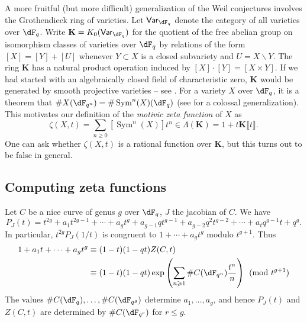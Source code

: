 A more fruitful (but more difficult) generalization of the Weil conjectures 
involves the Grothendieck ring of varieties. Let $\mathsf{Var}_{\dF_q}$ denote 
the category of all varieties over $\dF_q$. Write 
$\mathbf K=K_0(\mathsf{Var}_{\dF_q})$ for the quotient of the free abelian 
group on isomorphism classes of varieties over $\dF_q$ by relations of the 
form $[X]=[Y]+[U]$ whenever $Y\subset X$ is a closed subvariety and 
$U=X\smallsetminus Y$. The ring $\mathbf K$ has a natural product operation 
induced by $[X]\cdot [Y] = [X\times Y]$. If we had started with an 
algebraically closed field of characteristic zero, $\mathbf K$ would be 
generated by smooth projective varieties -- see \cite{bi04}.
For a variety $X$ over $\dF_q$, it is a theorem that 
$\# X(\dF_{q^n}) = \# \operatorname{Sym}^n(X)(\dF_q)$ (see 
\cite[III.2.11]{de77} for a colossal generalization). This motivates our 
definition of the \emph{motivic zeta function} of $X$ as 
\[
  \zeta(X,t) = \sum_{n\geqslant 0} [\operatorname{Sym}^n(X)] t^n \in \Lambda(\mathbf K) = 1+t\mathbf K\llbracket t\rrbracket \text{.}
\]
One can ask whether $\zeta(X,t)$ is a rational function over 
$\mathbf K$, but this turns out to be false in general. 





\subsection{Computing zeta functions}

Let $C$ be a nice curve of genus $g$ over $\dF_q$, $J$ the jacobian of $C$. We 
have 
\[
  P_J(t) = t^{2g} + a_1 t^{2g-1} + \cdots + a_g t^g + a_{g-1} q t^{g-1} + a_{g-2} q^2 t^{g-2} + \cdots + a_t q^{g-1} t + q^g \text{.}
\]
In particular, $t^{2g} P_J(1/t)$ is congruent to 
$1+\cdots + a_g t^g$ modulo $t^{g+1}$. Thus 
\begin{align*}
  1+ a_1 t + \cdots + a_g t^g &\equiv (1-t)(1-q t)Z(C,t) \\
    &\equiv (1-t)(1-q t)\exp\left(\sum_{n\geqslant 1} \# C(\dF_{q^n}) \frac{t^n}{n}\right) \pmod{t^{g+1}}
\end{align*}
The values $\# C(\dF_q),\dots,\# C(\dF_{q^g})$ determine $a_1,\dots,a_g$, and 
hence $P_J(t)$ and $Z(C,t)$ are determined by 
$\# C(\dF_{q^r})$ for $r\leqslant g$. 


